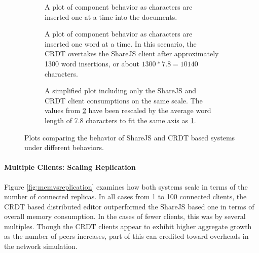 \documentclass[12pt,a4paper,twoside,openright]{report}
\begin{document}
				
				\begin{figure} [H]
				\centering
				\begin{subfigure}[t]{.45\textwidth}
				  \centering
				  
				  \caption[Single Client Memory Consumption with Character Insertion] {A plot of component behavior as characters are inserted one at a time into the documents.}
				  \label{fig:sub1}
				\end{subfigure}%
				\begin{subfigure}[t]{.45\textwidth}
				  \centering
				  
				  \caption{A plot of component behavior as characters are inserted one word at a time. In this scenario, the CRDT overtakes the ShareJS client after approximately 1300 word insertions, or about $1300*7.8 = 10140$ characters.}
				  \label{fig:sub2}
				\end{subfigure}
				\begin{subfigure}[t]{0.6\textwidth}
				  \centering
			  	  
				  \caption{A simplified plot including only the ShareJS and CRDT client consumptions on the same scale. The values from \ref{fig:sub2} have been rescaled by the average word length of 7.8 characters to fit the same axis as \ref{fig:sub1}.}
				  \label{fig:sub3}
				\end{subfigure}
				\caption[Single Client Memory Consumption]{Plots comparing the behavior of ShareJS and CRDT based systems under different behaviors.}
				\label{fig:singleclientmemory}
				\end{figure}
				
				
				
			\paragraph{Multiple Clients: Scaling Replication}
				Figure \ref{fig:memvsreplication} examines how both systems scale in terms of the number of connected replicas. In all cases from 1 to 100 connected clients, the CRDT based distributed editor outperformed the ShareJS based one in terms of overall memory consumption. In the cases of fewer clients, this was by several multiples. Though the CRDT clients appear to exhibit higher aggregate growth as the number of peers increases, part of this can credited toward overheads in the network simulation.
			
\end{document}
